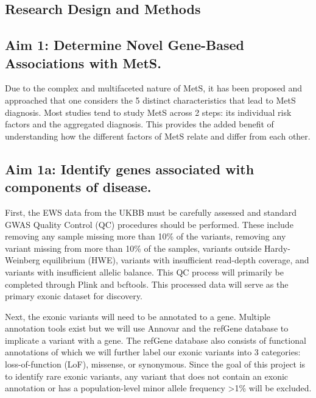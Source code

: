 \documentclass[11pt]{article}
\begin{document}
\subsection*{Research Design and Methods}

\subsection*{Aim 1: Determine Novel Gene-Based Associations with MetS.}

Due to the complex and multifaceted nature of MetS, it has been proposed and approached that one considers the 5 distinct characteristics that lead to MetS diagnosis. Most studies tend to study MetS across 2 steps: its individual risk factors and the aggregated diagnosis. This provides the added benefit of understanding how the different factors of MetS relate and differ from each other.

\subsection*{Aim 1a: Identify genes associated with components of disease.} 

First, the EWS data from the UKBB must be carefully assessed and standard GWAS Quality Control (QC) procedures should be performed. These include removing any sample missing more than 10\% of the variants, removing any variant missing from more than 10\% of the samples, variants outside Hardy-Weinberg equilibrium (HWE), variants with insufficient read-depth coverage, and variants with insufficient allelic balance. This QC process will primarily be completed through Plink and bcftools. This processed data will serve as the primary exonic dataset for discovery.

Next, the exonic variants will need to be annotated to a gene. Multiple annotation tools exist but we will use Annovar and the refGene database to implicate a variant with a gene. The refGene database also consists of functional annotations of which we will further label our exonic variants into 3 categories: loss-of-function (LoF), missense, or synonymous. Since the goal of this project is to identify rare exonic variants, any variant that does not contain an exonic annotation or has a population-level minor allele frequency >1\% will be excluded.
\end{document}
